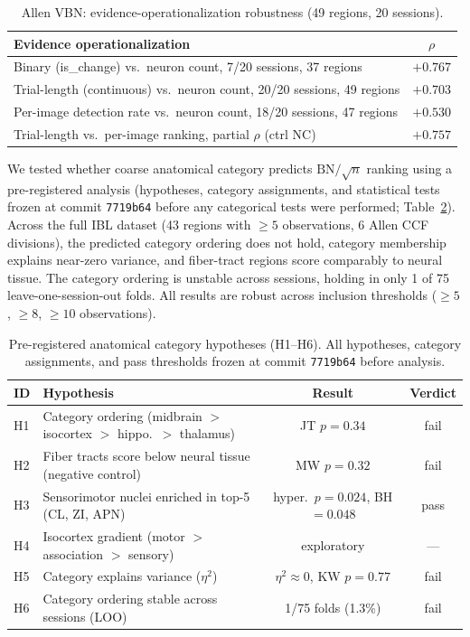 \documentclass[9pt,lineno]{elife}
\begin{document}
\begin{table}[t]
\centering
\caption{Allen VBN: evidence-operationalization robustness (49 regions, 20 sessions).}
\label{tab:allen}
\small
\begin{tabular}{lc}
\toprule
Evidence operationalization & $\rho$ \\
\midrule
Binary (is\_change) vs.\ neuron count, 7/20 sessions, 37 regions & $+0.767$ \\
Trial-length (continuous) vs.\ neuron count, 20/20 sessions, 49 regions & $+0.703$ \\
Per-image detection rate vs.\ neuron count, 18/20 sessions, 47 regions & $+0.530$ \\
\midrule
Trial-length vs.\ per-image ranking, partial $\rho$ (ctrl NC) & $\mathbf{+0.757}$ \\
\bottomrule
\end{tabular}
\end{table}

We tested whether coarse anatomical category predicts $\text{BN}/\!\sqrt{n}$ ranking using a pre-registered analysis (hypotheses, category assignments, and statistical tests frozen at commit \texttt{7719b64} before any categorical tests were performed; Table~\ref{tab:anatomical}). Across the full IBL dataset (43 regions with $\geq 5$ observations, 6 Allen CCF divisions), the predicted category ordering does not hold, category membership explains near-zero variance, and fiber-tract regions score comparably to neural tissue. The category ordering is unstable across sessions, holding in only 1 of 75 leave-one-session-out folds. All results are robust across inclusion thresholds ($\geq 5$, $\geq 8$, $\geq 10$ observations).

\begin{table}[t]
\centering
\caption{Pre-registered anatomical category hypotheses (H1--H6). All hypotheses, category assignments, and pass thresholds frozen at commit \texttt{7719b64} before analysis.}
\label{tab:anatomical}
\small
\begin{tabular}{llcc}
\toprule
ID & Hypothesis & Result & Verdict \\
\midrule
H1 & Category ordering (midbrain $>$ isocortex $>$ hippo.\ $>$ thalamus) & JT $p = 0.34$ & fail \\
H2 & Fiber tracts score below neural tissue (negative control) & MW $p = 0.32$ & fail \\
H3 & Sensorimotor nuclei enriched in top-5 (CL, ZI, APN) & hyper.\ $p = 0.024$, BH $= 0.048$ & pass \\
H4 & Isocortex gradient (motor $>$ association $>$ sensory) & exploratory & --- \\
H5 & Category explains variance ($\eta^2$) & $\eta^2 \approx 0$, KW $p = 0.77$ & fail \\
H6 & Category ordering stable across sessions (LOO) & 1/75 folds (1.3\%) & fail \\
\bottomrule
\end{tabular}
\end{table}
\end{document}
